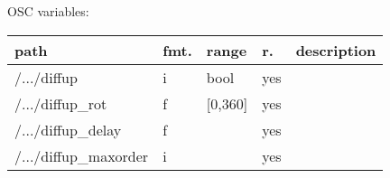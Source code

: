 \begin{snugshade}
{\footnotesize
\label{osctab:receivermodhoa2d}
OSC variables:
\nopagebreak

\begin{tabularx}{\textwidth}{llllX}
\hline
path & fmt. & range & r. & description\\
\hline
/.../diffup & i & bool & yes & \\
/.../diffup\_rot & f & [0,360] & yes & \\
/.../diffup\_delay & f &  & yes & \\
/.../diffup\_maxorder & i &  & yes & \\
\hline
\end{tabularx}
}
\end{snugshade}
